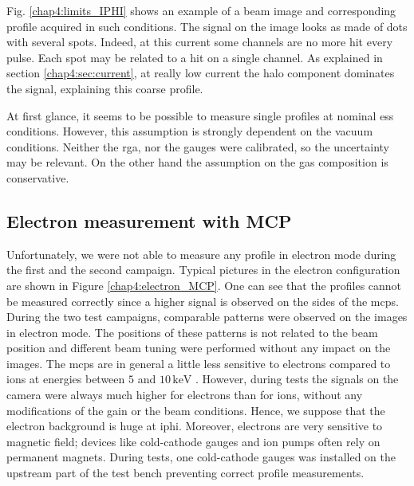 \begin{refsection}
  

  Fig. \ref{chap4:limits_IPHI} shows an example of a beam image and corresponding profile acquired in such conditions. The signal on the image looks as made of dots with several spots. Indeed, at this current some channels are no more hit every pulse. Each spot may be related to a hit on a single channel. As explained in section \ref{chap4:sec:current}, at really low current the halo component dominates the signal, explaining this coarse profile.

  At first glance, it seems to be possible to measure single profiles at nominal \acrshort{ess} conditions. However, this assumption is strongly dependent on the vacuum conditions. Neither the \acrshort{rga}, nor the gauges were calibrated, so the uncertainty may be relevant. On the other hand the assumption on the gas composition is conservative.

  

  \FloatBarrier
  \subsection{Electron measurement with MCP}
  Unfortunately, we were not able to measure any profile in electron mode during the first and the second campaign.
  Typical pictures in the electron configuration are shown in Figure \ref{chap4:electron_MCP}. One can see that the profiles cannot be measured correctly since a higher signal is observed on the sides of the \acrshort{mcp}s. During the two test campaigns, comparable patterns were observed on the images in electron mode. The positions of these patterns is not related to the beam position and different beam tuning were performed without any impact on the images.
  The \acrshort{mcp}s are in general a little less sensitive to electrons compared to ions at energies between $5$ and $10\,\mathrm{keV}$ \cite{Wiza1979}.
  However, during tests the signals on the camera were always much higher for electrons than for ions, without any modifications of the gain or the beam conditions. Hence, we suppose that the electron background is huge at \acrshort{iphi}.
  Moreover, electrons are very sensitive to magnetic field; devices like cold-cathode gauges and ion pumps often rely on permanent magnets. During tests, one cold-cathode gauges was installed on the upstream part of the test bench preventing correct profile measurements.

  


\end{refsection}
